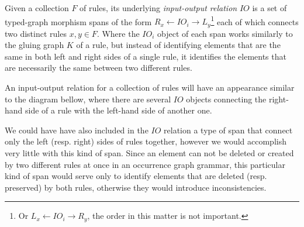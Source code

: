 \begin{definition} Given a collection $F$ of rules, its underlying \emph{input-output relation} $IO$ is a set of typed-graph morphism spans of the form \mbox{$R_x \leftarrow IO_i \rightarrow L_y$}\footnote{ Or \mbox{$L_x \leftarrow IO_i \rightarrow R_y$}, the order in this matter is not important.} each of which connects two distinct rules $x,y \in F$. Where the $IO_i$ object of each span works similarly to the gluing graph $K$ of a rule, but instead of identifying elements that are the same in both left and right sides of a single rule, it identifies the elements that are necessarily the same between two different rules.

  An input-output relation for a collection of rules will have an appearance similar to the diagram bellow, where there are several $IO$ objects connecting the right-hand side of a rule with the left-hand side of another one.

\hfill\break

\end{definition}

\begin{remark}We could have have also included in the $IO$ relation a type of span that connect only the left (resp. right) sides of rules together, however we would accomplish very little with this kind of span. Since an element can not be deleted or created by two different rules at once in an occurrence graph grammar, this particular kind of span would serve only to identify elements that are deleted (resp. preserved) by both rules, otherwise they would introduce inconsistencies.
\end{remark}

